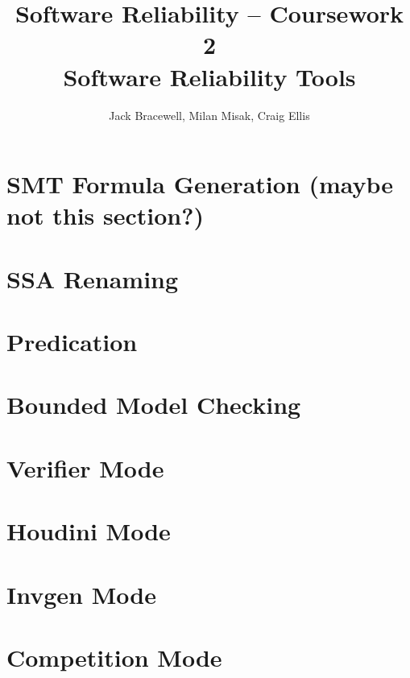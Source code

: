 \documentclass[11pt]{article}
\title{Software Reliability -- Coursework 2 \\ Software Reliability Tools}
\author{Jack Bracewell, Milan Misak, Craig Ellis}
\date{}
\begin{document}
\maketitle

\section{SMT Formula Generation (maybe not this section?)}
\section{SSA Renaming}
\section{Predication}
\section{Bounded Model Checking}
\section{Verifier Mode}
\section{Houdini Mode}
\section{Invgen Mode}
\section{Competition Mode}
\end{document}
